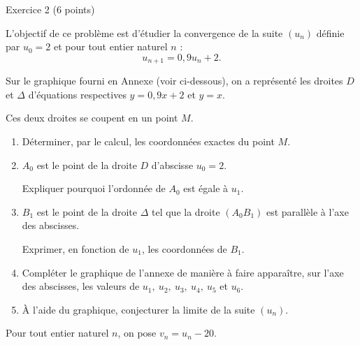 
%
\begin{h2}Exercice 2 (6 points)\end{h2}
\par
L'objectif de ce problème est d'étudier la convergence de la suite $(u_n)$ définie par $u_0=2$ et pour tout entier naturel $n$ :
\[ u_{n+1} = 0,9u_n+2.\]
\par
\par
{}
\par
Sur le graphique fourni en Annexe (voir ci-dessous), on a représenté les droites $D$ et $\Delta$ d'équations respectives $y=0,9x+2$ et $y=x$.
\par
Ces deux droites se coupent en un point $M$.
\par
\begin{enumerate}
     \item
     Déterminer, par le calcul, les coordonnées exactes du point $M$.
     \item
     $A_0$ est le point de la droite $D$ d'abscisse $u_0=2$.
     \par
     Expliquer pourquoi l'ordonnée de $A_0$ est égale à $u_1$.
     \item
     $B_1$ est le point de la droite $\Delta$ tel que la droite $(A_0B_1)$ est parallèle à l'axe des abscisses.
     \par
     Exprimer, en fonction de $u_1$, les coordonnées de $B_1$.
     \item
     Compléter le graphique de l'annexe de manière à faire apparaître, sur l'axe des abscisses, les valeurs de $u_1,\ u_2,\ u_3,\ u_4,\ u_5$ et $u_6$.
     \item
     \`A l'aide du graphique, conjecturer la limite de la suite $(u_n)$.
     \par
\end{enumerate}
\par
\par
{}
\par
Pour tout entier naturel $n$, on pose $v_n=u_n-20$.
